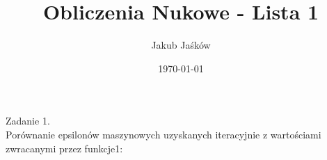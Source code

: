 \documentclass[11pt]{article}
\title{Obliczenia Nukowe -  Lista 1}
\author{Jakub Jaśków}
\date{\today}
\begin{document}
\maketitle
Zadanie 1.\\
	Porównanie epsilonów maszynowych uzyskanych iteracyjnie z wartościami zwracanymi przez funkcje1:\\
\end{document}
